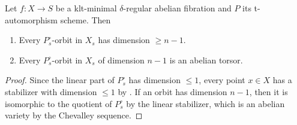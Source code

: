 \documentclass[reqno, letterpaper]{amsart}
\numberwithin{equation}{subsection}
\let\to\longrightarrow
\begin{document}
		\begin{lemma} \label{lem:P-orbit has dimension n-1}
			Let $f : X \to S$ be a klt-minimal $\delta$-regular abelian fibration and $P$ its t-automorphism scheme. Then
			\begin{enumerate}
				\item Every $P^\circ_s$-orbit in $X_s$ has dimension $\ge n-1$.
				\item Every $P^\circ_s$-orbit in $X_s$ of dimension $n-1$ is an abelian torsor.
			\end{enumerate}
		\end{lemma}
		\begin{proof}
			Since the linear part of $P^\circ_s$ has dimension $\le 1$, every point $x \in X$ has a stabilizer with dimension $\le 1$ by . If an orbit has dimension $n-1$, then it is isomorphic to the quotient of $P^\circ_s$ by the linear stabilizer, which is an abelian variety by the Chevalley sequence.
		\end{proof}
		
\end{document}
